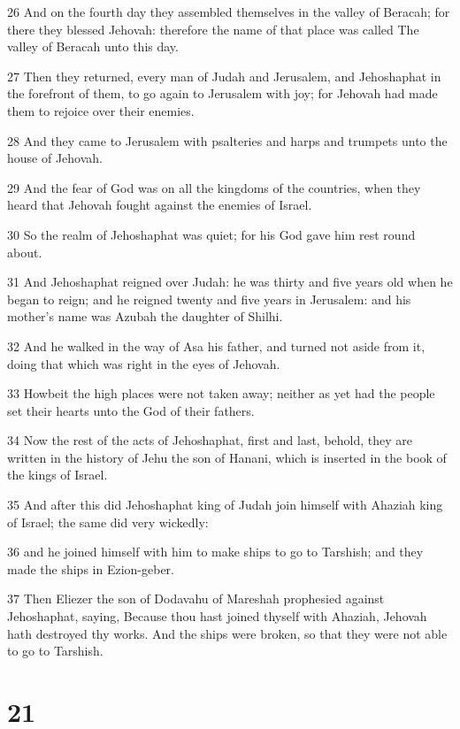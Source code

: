 \par 26 And on the fourth day they assembled themselves in the valley of Beracah; for there they blessed Jehovah: therefore the name of that place was called The valley of Beracah unto this day.
\par 27 Then they returned, every man of Judah and Jerusalem, and Jehoshaphat in the forefront of them, to go again to Jerusalem with joy; for Jehovah had made them to rejoice over their enemies.
\par 28 And they came to Jerusalem with psalteries and harps and trumpets unto the house of Jehovah.
\par 29 And the fear of God was on all the kingdoms of the countries, when they heard that Jehovah fought against the enemies of Israel.
\par 30 So the realm of Jehoshaphat was quiet; for his God gave him rest round about.
\par 31 And Jehoshaphat reigned over Judah: he was thirty and five years old when he began to reign; and he reigned twenty and five years in Jerusalem: and his mother's name was Azubah the daughter of Shilhi.
\par 32 And he walked in the way of Asa his father, and turned not aside from it, doing that which was right in the eyes of Jehovah.
\par 33 Howbeit the high places were not taken away; neither as yet had the people set their hearts unto the God of their fathers.
\par 34 Now the rest of the acts of Jehoshaphat, first and last, behold, they are written in the history of Jehu the son of Hanani, which is inserted in the book of the kings of Israel.
\par 35 And after this did Jehoshaphat king of Judah join himself with Ahaziah king of Israel; the same did very wickedly:
\par 36 and he joined himself with him to make ships to go to Tarshish; and they made the ships in Ezion-geber.
\par 37 Then Eliezer the son of Dodavahu of Mareshah prophesied against Jehoshaphat, saying, Because thou hast joined thyself with Ahaziah, Jehovah hath destroyed thy works. And the ships were broken, so that they were not able to go to Tarshish.

\chapter{21}

